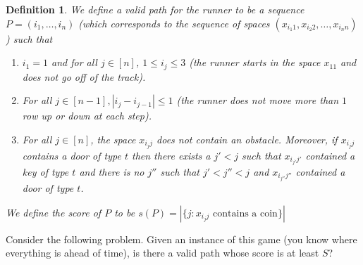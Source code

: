 \documentclass[12pt]{article}
\newtheorem{definition}[theorem]{Definition}
\begin{document}
\begin{definition}
We define a valid path for the runner to be a sequence $P = (i_1,\ldots,i_n)$ (which corresponds to the sequence of spaces $(x_{{i_1}1}, x_{{i_2}2}, \ldots, x_{{i_n}n})$) such that 
\begin{enumerate}
\item $i_1 = 1$ and for all $j \in [n]$, $1 \leq i_j \leq 3$ (the runner starts in the space $x_{11}$ and does not go off of the track).
\item For all $j \in [n-1], |i_{j} - i_{j-1}| \leq 1$ (the runner does not move more than $1$ row up or down at each step).
\item For all $j \in [n]$, the space $x_{{i_j}j}$ does not contain an obstacle. Moreover, if $x_{{i_j}j}$ contains a door of type $t$ then there exists a $j' < j$ such that $x_{{i_{j'}}{j'}}$ contained a key of type $t$ and there is no $j''$ such that $j' < j'' < j$ and $x_{{i_{j''}}{j''}}$ contained a door of type $t$.
\end{enumerate}
We define the score of $P$ to be $s(P) = |\{j:x_{{i_j}j} \text{ contains a coin}\}|$
\end{definition}
Consider the following problem. Given an instance of this game (you know where everything is ahead of time), is there a valid path whose score is at least $S$?
\end{document}
